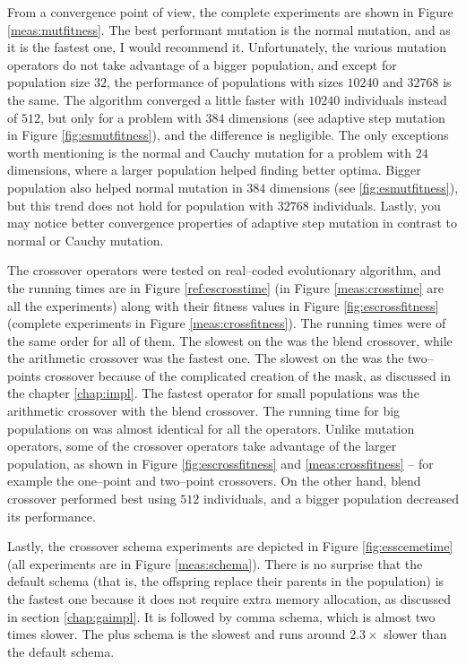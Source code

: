 From a convergence point of view, the complete experiments are shown in Figure \ref{meas:mutfitness}. The best performant mutation is the normal mutation, and as it is the fastest one, I would recommend it. Unfortunately, the various mutation operators do not take advantage of a bigger population, and except for population size $32$, the performance of populations with sizes $10240$ and $32768$ is the same. The algorithm converged a little faster with $10240$ individuals instead of $512$, but only for a problem with $384$ dimensions (see adaptive step mutation in Figure \ref{fig:esmutfitness}), and the difference is negligible. The only exceptions worth mentioning is the normal and Cauchy mutation for a problem with $24$ dimensions, where a larger population helped finding better optima. Bigger population also helped normal mutation in $384$ dimensions (see \ref{fig:esmutfitness}), but this trend does not hold for population with $32768$ individuals. Lastly, you may notice better convergence properties of adaptive step mutation in contrast to normal or Cauchy mutation.

The crossover operators were tested on real--coded evolutionary algorithm, and the running times are in Figure \ref{ref:escrosstime} (in Figure \ref{meas:crosstime} are all the experiments) along with their fitness values in Figure \ref{fig:escrossfitness} (complete experiments in Figure \ref{meas:crossfitness}). The running times were of the same order for all of them. The slowest on the \cpu was the blend crossover, while the arithmetic crossover was the fastest one. The slowest on the \cpu was the two--points crossover because of the complicated creation of the mask, as discussed in the chapter \ref{chap:impl}. The fastest operator for small populations was the arithmetic crossover with the blend crossover. The running time for big populations on \gpu was almost identical for all the operators. Unlike mutation operators, some of the crossover operators take advantage of the larger population, as shown in Figure \ref{fig:escrossfitness} and \ref{meas:crossfitness} -- for example the one--point and two--point crossovers. On the other hand, blend crossover performed best using $512$ individuals, and a bigger population decreased its performance.

Lastly, the crossover schema experiments are depicted in Figure \ref{fig:esscemetime} (all experiments are in Figure \ref{meas:schema}). There is no surprise that the default schema (that is, the offspring replace their parents in the population) is the fastest one because it does not require extra memory allocation, as discussed in section \ref{chap:gaimpl}. It is followed by comma schema, which is almost two times slower. The plus schema is the slowest and runs around $2.3\times$ slower than the default schema.

